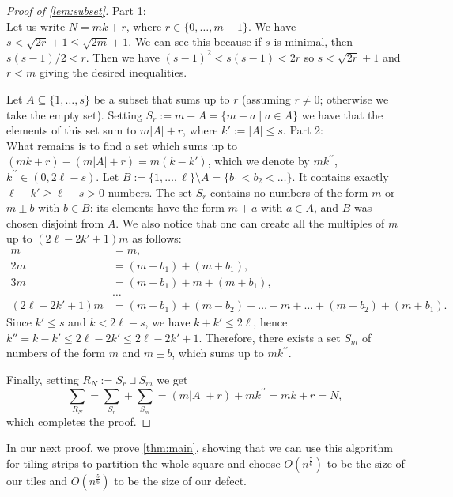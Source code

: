 \documentclass[11pt, reqno, psamsfonts]{amsart}
\theoremstyle{plain}
\theoremstyle{definition}
\theoremstyle{remark}
\begin{document}
\begin{proof}[Proof of \cref{lem:subset}]
  Part 1:\\
    Let us write $N = mk + r$, where $r \in \{0, \ldots, m - 1\}$.
  We have $s < \sqrt{2r}+1 \leq \sqrt{2m}+1$. We can see this because if $s$ is minimal, then $s(s - 1)/2 < r$. Then we have $(s-1)^2<s(s-1)<2r$ so $s<\sqrt{2r}+1$ and $r<m$ giving the desired inequalities.

    Let $A \subseteq \{1, \ldots, s\}$ be a subset that sums up to $r$ (assuming $r \neq 0$; otherwise we take the empty set). Setting $S_r := m + A = \{m + a \mid a \in A\}$ we have that the elements of this set sum to $m|A| + r$, where $k' := |A| \leq s$.
    Part 2:\\
    What remains is to find a set which sums up to $(mk + r) - (m|A| + r) = m(k - k')$, which we denote by $mk^{\prime\prime}$, $k^{\prime\prime} \in (0, 2\ell - s)$.
    Let $B := \{1, \ldots, \ell\} \setminus A = \{b_1 < b_2 < \ldots \}$. 
    It contains exactly $\ell - k' \geq \ell - s > 0$ numbers. The set $S_r$ contains no numbers of the form $m$ or $m \pm b$ with $b \in B$: its elements have the form $m + a$ with $a \in A$, and $B$ was chosen disjoint from $A$.
    We also notice that one can create all the multiples of $m$ up to $(2\ell - 2k' + 1)m$ as follows:
    \[
        \begin{split}
            m &= m, \\
            2m &= (m - b_1) + (m + b_1), \\
            3m &= (m - b_1) + m + (m + b_1), \\
            &\ldots \\
            (2\ell - 2k' + 1)m &= (m - b_1) + (m - b_2) + \ldots + m + \ldots + (m + b_2) + (m + b_1).
        \end{split}
    \]
Since $k' \leq s$ and $k < 2\ell - s$, we have $k+k'\leq 2\ell$, hence $k'' = k - k' \leq 2\ell - 2k' \leq 2\ell - 2k' + 1$.
    Therefore, there exists a set $S_m$ of numbers of the form $m$ and $m \pm b$, which sums up to $mk^{\prime\prime}$.
    
    Finally, setting $R_N := S_r \sqcup S_m$ we get
    \[
    \sum_{R_N} = \sum_{S_r} + \sum_{S_m} = (m|A| + r) + mk^{\prime\prime} = mk + r = N,
    \]
    which completes the proof.
\end{proof}
In our next proof, we prove \cref{thm:main}, showing that we can use this algorithm for tiling strips to partition the whole square and choose $O(n^\frac{7}{6})$ to be the size of our tiles and $O(n^\frac{5}{6})$ to be the size of our defect. 
\end{document}
